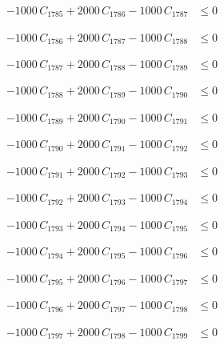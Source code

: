 \documentclass[a4paper,11pt]{article}
\begin{document}
\begin{align}
-1000\,C_{1785} + 2000\,C_{1786} - 1000\,C_{1787} &\leq 0 \nonumber
\end{align}

\begin{align}
-1000\,C_{1786} + 2000\,C_{1787} - 1000\,C_{1788} &\leq 0 \nonumber
\end{align}

\begin{align}
-1000\,C_{1787} + 2000\,C_{1788} - 1000\,C_{1789} &\leq 0 \nonumber
\end{align}

\begin{align}
-1000\,C_{1788} + 2000\,C_{1789} - 1000\,C_{1790} &\leq 0 \nonumber
\end{align}

\begin{align}
-1000\,C_{1789} + 2000\,C_{1790} - 1000\,C_{1791} &\leq 0 \nonumber
\end{align}

\begin{align}
-1000\,C_{1790} + 2000\,C_{1791} - 1000\,C_{1792} &\leq 0 \nonumber
\end{align}

\begin{align}
-1000\,C_{1791} + 2000\,C_{1792} - 1000\,C_{1793} &\leq 0 \nonumber
\end{align}

\begin{align}
-1000\,C_{1792} + 2000\,C_{1793} - 1000\,C_{1794} &\leq 0 \nonumber
\end{align}

\begin{align}
-1000\,C_{1793} + 2000\,C_{1794} - 1000\,C_{1795} &\leq 0 \nonumber
\end{align}

\begin{align}
-1000\,C_{1794} + 2000\,C_{1795} - 1000\,C_{1796} &\leq 0 \nonumber
\end{align}

\begin{align}
-1000\,C_{1795} + 2000\,C_{1796} - 1000\,C_{1797} &\leq 0 \nonumber
\end{align}

\begin{align}
-1000\,C_{1796} + 2000\,C_{1797} - 1000\,C_{1798} &\leq 0 \nonumber
\end{align}

\begin{align}
-1000\,C_{1797} + 2000\,C_{1798} - 1000\,C_{1799} &\leq 0 \nonumber
\end{align}
\end{document}
